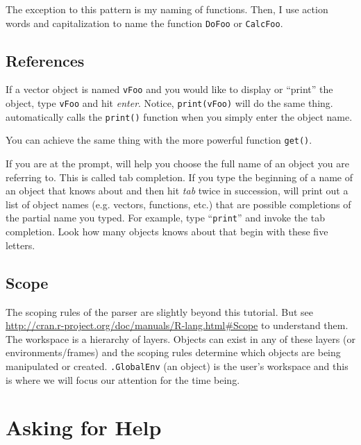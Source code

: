 The exception to this pattern is my naming of functions. Then, I use
action words and capitalization to name the function \texttt{DoFoo} or
\texttt{CalcFoo}.

\subsection{References}

If a vector object is named \texttt{vFoo} and you would like to
display or ``print'' the object, type \texttt{vFoo} and hit
\textit{enter}. Notice, \verb=print(vFoo)= will do the same
thing. \R{} automatically calls the \texttt{print()} function when you
simply enter the object name.

You can achieve the same thing with the more powerful function
\texttt{get()}.

If you are at the \R{} prompt, \R{} will help you choose the full name
of an object you are referring to. This is called tab completion. If
you type the beginning of a name of an object that \R{} knows about
and then hit \textit{tab} twice in succession, \R{} will print out a
list of object names (e.g. vectors, functions, etc.) that are
possible completions of the partial name you typed. For example, type
``\texttt{print}'' and invoke the tab completion. Look how many
objects \R{} knows about that begin with these five letters.

\subsection{Scope}

The scoping rules of the \R{} parser are slightly beyond this
tutorial. But see
\url{http://cran.r-project.org/doc/manuals/R-lang.html#Scope} to
understand them. The \R{} workspace is a hierarchy of layers. Objects
can exist in any of these layers (or environments/frames) and the
scoping rules determine which objects are being manipulated or
created. \texttt{.GlobalEnv} (an object) is the user's workspace and this is where
we will focus our attention for the time being.

\section{Asking for Help}

